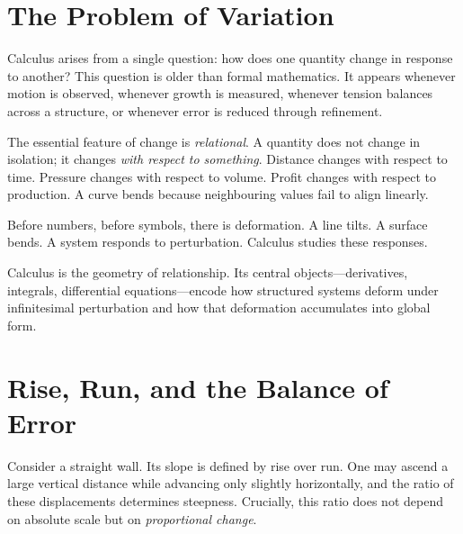 \documentclass[12pt,openany]{book}
\begin{document}
\section{The Problem of Variation}

Calculus arises from a single question: how does one quantity change in response
to another? This question is older than formal mathematics. It appears whenever
motion is observed, whenever growth is measured, whenever tension balances
across a structure, or whenever error is reduced through refinement.

The essential feature of change is \emph{relational}. A quantity does not change
in isolation; it changes \emph{with respect to something}. Distance changes with
respect to time. Pressure changes with respect to volume. Profit changes with
respect to production. A curve bends because neighbouring values fail to align
linearly.

Before numbers, before symbols, there is deformation. A line tilts. A surface
bends. A system responds to perturbation. Calculus studies these responses.

\begin{insight}
  Calculus is the geometry of relationship. Its central objects—derivatives,
  integrals, differential equations—encode how structured systems deform under
  infinitesimal perturbation and how that deformation accumulates into global
  form.
\end{insight}

\section{Rise, Run, and the Balance of Error}

Consider a straight wall. Its slope is defined by rise over run. One may ascend
a large vertical distance while advancing only slightly horizontally, and the
ratio of these displacements determines steepness. Crucially, this ratio does
not depend on absolute scale but on \emph{proportional change}.
\end{document}
